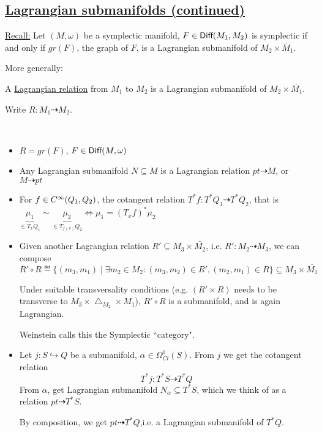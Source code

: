 \documentclass[x11names,reqno,14pt]{extarticle}
\newcommand{\into}{\hookrightarrow}
\begin{document}
\subsection*{\underline{Lagrangian submanifolds (continued)}}

\underline{Recall:} Let $(M,\omega)$ be a symplectic manifold, $F \in {{\text{\sffamily {Diff}}}}(M_1,M_2)$ is symplectic if and only if $gr(F)$, the graph of $F$, is a Lagrangian submanifold of $M_2\times\bar{M}_1$.

More generally: 


A \underline{Lagrangian relation} from $M_1$ to $M_2$ is a Lagrangian submanifold of $M_2\times \bar{M_1}$. 

Write $R:M_1\dashrightarrow M_2$.

\exm
\,
\begin{itemize}

\item $R = gr(F)$, $F \in {{\text{\sffamily {Diff}}}}(M,\omega)$

\item Any Lagrangian submanifold $N \subseteq M$ is a Lagrangian relation $pt\dashrightarrow M$, or $M\dashrightarrow pt$ 

\item For $f \in C^\infty(Q_1,Q_2)$, the cotangent relation $T^*f: T^*Q_1\dashrightarrow T^*Q_2$, that is $\underbrace{\mu_1}_{\in T_xQ_1}\sim\underbrace{\mu_2}_{\in T_{f(x)}Q_2} \iff \mu_1 = (T_xf)^*\mu_2$

\item Given another Lagrangian relation $R'\subseteq M_3\times\bar{M_2}$, i.e. $R':M_2\dashrightarrow M_3$, we can compose 
\[
R'\circ R\eqdef \{(m_3,m_1) \mid \exists m_2\in M_2: (m_3,m_2)\in R', (m_2,m_1) \in R\} \subseteq M_3\times\bar{M_1}
\]

Under suitable transversality conditions (e.g. $(R'\times R)$ needs to be transverse to $M_3\times\bigtriangleup_{M_2}\times M_1$), $R'\circ R$ is a submanifold, and is again Lagrangian.

Weinstein calls this the Symplectic ``category". 

\item Let $j:S\into Q$ be a submanifold, $\alpha\in\Omega^1_{Cl}(S)$. From $j$ we get the cotangent relation 
\[
T^*j: T^*S\dashrightarrow T^*Q
\]
From $\alpha$, get Lagrangian submanifold $N_\alpha \subseteq T^*S$, which we think of as a relation $pt\dashrightarrow T^*S$. 

By composition, we get $pt\dashrightarrow T^*Q$,i.e. a Lagrangian submanifold of $T^*Q$. 

\end{itemize}
\end{document}
